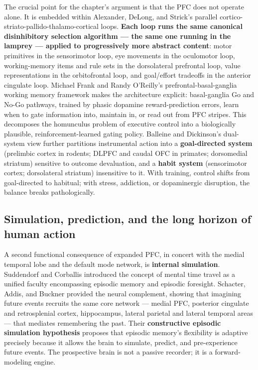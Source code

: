 The crucial point for the chapter's argument is that the PFC does not operate alone. It is embedded within Alexander, DeLong, and Strick's parallel cortico-striato-pallido-thalamo-cortical loops. \textbf{Each loop runs the same canonical disinhibitory selection algorithm --- the same one running in the lamprey --- applied to progressively more abstract content}: motor primitives in the sensorimotor loop, eye movements in the oculomotor loop, working-memory items and rule sets in the dorsolateral prefrontal loop, value representations in the orbitofrontal loop, and goal/effort tradeoffs in the anterior cingulate loop. Michael Frank and Randy O'Reilly's prefrontal-basal-ganglia working memory framework makes the architecture explicit: basal-ganglia Go and No-Go pathways, trained by phasic dopamine reward-prediction errors, learn when to gate information into, maintain in, or read out from PFC stripes. This decomposes the homunculus problem of executive control into a biologically plausible, reinforcement-learned gating policy. Balleine and Dickinson's dual-system view further partitions instrumental action into a \textbf{goal-directed system} (prelimbic cortex in rodents; DLPFC and caudal OFC in primates; dorsomedial striatum) sensitive to outcome devaluation, and a \textbf{habit system} (sensorimotor cortex; dorsolateral striatum) insensitive to it. With training, control shifts from goal-directed to habitual; with stress, addiction, or dopaminergic disruption, the balance breaks pathologically.

\subsection{Simulation, prediction, and the long horizon of human action}\label{05_vertebrates-simulation-prediction-and-the-long-horizon-of-human-action}

A second functional consequence of expanded PFC, in concert with the medial temporal lobe and the default mode network, is \textbf{internal simulation}. Suddendorf and Corballis introduced the concept of mental time travel as a unified faculty encompassing episodic memory and episodic foresight. Schacter, Addis, and Buckner provided the neural complement, showing that imagining future events recruits the same core network --- medial PFC, posterior cingulate and retrosplenial cortex, hippocampus, lateral parietal and lateral temporal areas --- that mediates remembering the past. Their \textbf{constructive episodic simulation hypothesis} proposes that episodic memory's flexibility is adaptive precisely because it allows the brain to simulate, predict, and pre-experience future events. The prospective brain is not a passive recorder; it is a forward-modeling engine.

